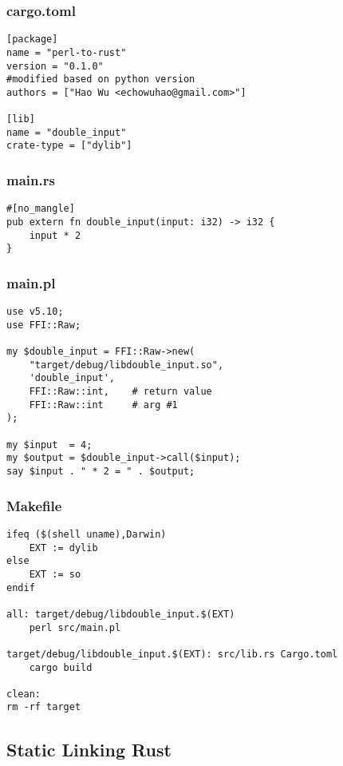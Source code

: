 \documentclass{beamer}
\begin{document}
\begin{frame}[fragile]
\frametitle{cargo.toml}
\begin{verbatim}
[package]
name = "perl-to-rust"
version = "0.1.0"
#modified based on python version
authors = ["Hao Wu <echowuhao@gmail.com>"]

[lib]
name = "double_input"
crate-type = ["dylib"]
\end{verbatim}
\end{frame}


\begin{frame}[fragile]
\frametitle{main.rs}
\begin{verbatim}
#[no_mangle]
pub extern fn double_input(input: i32) -> i32 {
    input * 2
}
\end{verbatim}
\end{frame}


\begin{frame}[fragile]
\frametitle{main.pl}
\begin{verbatim}
use v5.10;
use FFI::Raw;

my $double_input = FFI::Raw->new(
    "target/debug/libdouble_input.so",
    'double_input',
    FFI::Raw::int,    # return value
    FFI::Raw::int     # arg #1
);

my $input  = 4;
my $output = $double_input->call($input);
say $input . " * 2 = " . $output;
\end{verbatim}
\end{frame}

\begin{frame}[fragile]
\frametitle{Makefile}
\begin{verbatim}
ifeq ($(shell uname),Darwin)
    EXT := dylib
else
    EXT := so
endif

all: target/debug/libdouble_input.$(EXT)
    perl src/main.pl

target/debug/libdouble_input.$(EXT): src/lib.rs Cargo.toml
    cargo build

clean:
rm -rf target
\end{verbatim}
\end{frame}


\subsection{Static Linking Rust}

\begin{frame}[fragile]
\tableofcontents[currentsubsection]
\end{frame}
\end{document}

